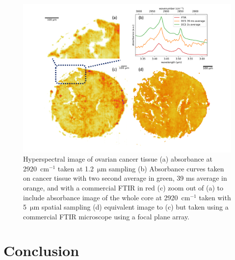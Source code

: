 \documentclass{optica-article}
\begin{document}
\begin{figure}[h]
    \centering
    \includegraphics[width=\linewidth]{bio_image_w_FTIR_comparison.png}
    \caption{Hyperspectral image of ovarian cancer tissue (a) absorbance at \mbox{2920 $\mathrm{cm^{-1}}$} taken at \mbox{1.2 $\mathrm{\mu m}$} sampling (b) Absorbance curves taken on cancer tissue with two second average in green, 39 ms average in orange, and with a commercial FTIR in red (c) zoom out of (a) to include absorbance image of the whole core at \mbox{2920 $\mathrm{cm^{-1}}$} taken with \mbox{5 $\mathrm{\mu m}$} spatial sampling (d) equivalent image to (c) but taken using a commercial FTIR microscope using a focal plane array.}
    \label{fig:bio}
\end{figure}

\section{Conclusion}
\end{document}
